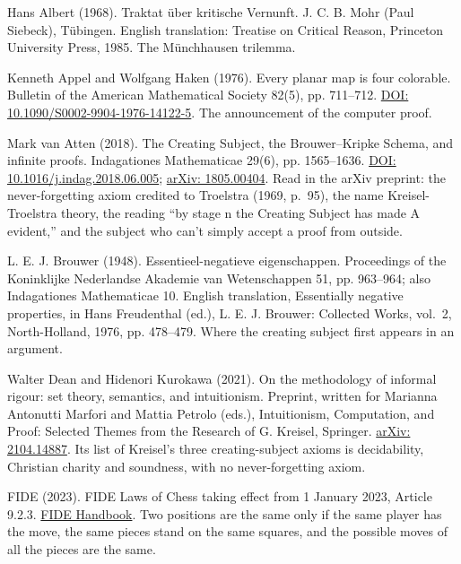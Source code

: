 \noindent Hans Albert (1968). Traktat \"uber kritische Vernunft. J. C. B. Mohr (Paul Siebeck), T\"ubingen. English translation: Treatise on Critical Reason, Princeton University Press, 1985. The M\"unchhausen trilemma.
\par\medskip

\noindent Kenneth Appel and Wolfgang Haken (1976). Every planar map is four colorable. Bulletin of the American Mathematical Society 82(5), pp. 711--712. \href{https://doi.org/10.1090/S0002-9904-1976-14122-5}{DOI: 10.1090/S0002-9904-1976-14122-5}. The announcement of the computer proof.
\par\medskip

\noindent Mark van Atten (2018). The Creating Subject, the Brouwer--Kripke Schema, and infinite proofs. Indagationes Mathematicae 29(6), pp. 1565--1636. \href{https://doi.org/10.1016/j.indag.2018.06.005}{DOI: 10.1016/j.indag.2018.06.005}; \href{https://arxiv.org/abs/1805.00404}{arXiv: 1805.00404}. Read in the arXiv preprint: the never-forgetting axiom credited to Troelstra (1969, p.~95), the name Kreisel-Troelstra theory, the reading ``by stage n the Creating Subject has made A evident,'' and the subject who can't simply accept a proof from outside.
\par\medskip

\noindent L. E. J. Brouwer (1948). Essentieel-negatieve eigenschappen. Proceedings of the Koninklijke Nederlandse Akademie van Wetenschappen 51, pp. 963--964; also Indagationes Mathematicae 10. English translation, Essentially negative properties, in Hans Freudenthal (ed.), L. E. J. Brouwer: Collected Works, vol.~2, North-Holland, 1976, pp. 478--479. Where the creating subject first appears in an argument.
\par\medskip

\noindent Walter Dean and Hidenori Kurokawa (2021). On the methodology of informal rigour: set theory, semantics, and intuitionism. Preprint, written for Marianna Antonutti Marfori and Mattia Petrolo (eds.), Intuitionism, Computation, and Proof: Selected Themes from the Research of G. Kreisel, Springer. \href{https://arxiv.org/abs/2104.14887}{arXiv: 2104.14887}. Its list of Kreisel's three creating-subject axioms is decidability, Christian charity and soundness, with no never-forgetting axiom.
\par\medskip

\noindent FIDE (2023). FIDE Laws of Chess taking effect from 1 January 2023, Article 9.2.3. \href{https://handbook.fide.com/chapter/E012023}{FIDE Handbook}. Two positions are the same only if the same player has the move, the same pieces stand on the same squares, and the possible moves of all the pieces are the same.
\par\medskip

